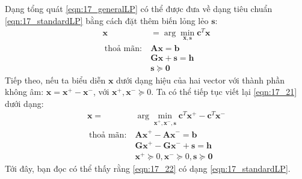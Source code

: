 {}

Dạng tổng quát \eqref{eqn:17_generalLP} có thể được đưa về dạng tiêu chuẩn
\eqref{eqn:17_standardLP} bằng cách đặt thêm biến lỏng lẻo $\mathbf{s}$:
\begin{equation}
\label{eqn:17_21}
\begin{aligned}
\mathbf{x} &= \arg\min_{\mathbf{x}, \mathbf{s}} \mathbf{c}^T\mathbf{x} \\\
\text{thoả mãn:}~ & \mathbf{Ax} = \mathbf{b}\\\
& \mathbf{Gx} + \mathbf{s} = \mathbf{h} \\\
& \mathbf{s} \succeq \mathbf{0}
\end{aligned}
\end{equation}
Tiếp theo, nếu ta biểu diễn $\mathbf{x}$ dưới dạng hiệu của hai vector với thành
phần không âm: $\mathbf{x} = \mathbf{x}^+ - \mathbf{x}^-$, với
$\mathbf{x}^+, \mathbf{x}^- \succeq 0$. Ta có thể tiếp tục viết lại
\eqref{eqn:17_21} dưới dạng:
\begin{equation}
\label{eqn:17_22}
\begin{aligned}
\mathbf{x} =& \arg\min_{\mathbf{x}^+,\mathbf{x}^-, \mathbf{s}} \mathbf{c}^T\mathbf{x}^+ - \mathbf{c}^T\mathbf{x}^- \\\
\text{thoả mãn:}~ & \mathbf{Ax}^+ - \mathbf{Ax}^- = \mathbf{b} \\\
& \mathbf{Gx}^+ - \mathbf{Gx}^- + \mathbf{s} = \mathbf{h} \\\
& \mathbf{x}^+ \succeq 0, \mathbf{x}^- \succeq 0, \mathbf{s} \succeq \mathbf{0}
\end{aligned}
\end{equation}
Tới đây, bạn đọc có thể thấy rằng \eqref{eqn:17_22} có dạng
\eqref{eqn:17_standardLP}.


